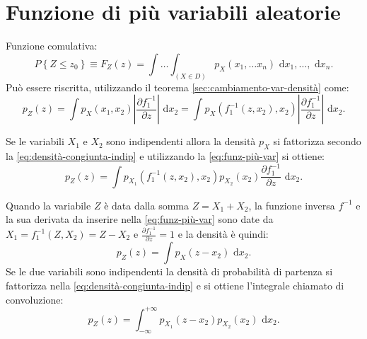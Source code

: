 \section{Funzione di più variabili aleatorie} %
\label{sec:funz-più-var}
Funzione comulativa:
\begin{equation}
P\left\{ Z\le z_{ 0 } \right\} \equiv F_{ Z }\left( z \right) =\int  \dots \int _{ ({X} \in D) }{ p_{ {X} }\left( x_{ 1 },\dots x_{ n } \right) \textrm{ d}x_{ 1 },\dots ,\textrm{ d}x_{ n } } .
\end{equation}
Può essere riscritta, utilizzando il teorema \ref{sec:cambiamento-var-densità} come:
\begin{equation}
\label{eq:funz-più-var}
p_{ Z }\left( z \right) =\int { { p }_{ X }\left( { x }_{ 1 },{ x }_{ 2 } \right) \left| \frac { \partial { f }_{ 1 }^{ -1 } }{ \partial z }  \right| \textrm{ d}{ x }_{ 2 } } =\int { { p }_{ X }\left( { f }_{ 1 }^{ -1 }\left( { z },{ x }_{ 2 } \right) ,{ x }_{ 2 } \right) \left| \frac { \partial { f }_{ 1 }^{ -1 } }{ \partial z }  \right| \textrm{ d}{ x }_{ 2 } } .
\end{equation}

Se le variabili $X_1$ e $X_2$ sono indipendenti allora la densità $p_X$ si fattorizza secondo la \ref{eq:densità-congiunta-indip} e utilizzando la \ref{eq:funz-più-var} si ottiene:
\begin{equation}
p_{ Z }\left( z \right) =\int { { p }_{ { X }_{ 1 } }\left( { f }_{ 1 }^{ -1 }\left( { z },{ x }_{ 2 } \right) ,{ x }_{ 2 } \right) { p }_{ { X }_{ 2 } }\left( { x }_{ 2 } \right) \frac { \partial { f }_{ 1 }^{ -1 } }{ \partial z } \textrm{ d}{ x }_{ 2 } } .
\end{equation}

Quando la variabile $Z$ è data dalla somma $Z=X_1+X_2$, la funzione inversa $f^{-1}$ e la sua derivata da inserire nella \ref{eq:funz-più-var} sono date da ${ X }_{ 1 }={ f }_{ 1 }^{ -1 }\left( Z,{ X }_{ 2 } \right) =Z-{ X }_{ 2 }$ e $\frac { \partial { f }_{ 1 }^{ -1 } }{ \partial z } =1$ e la densità è quindi:
\begin{equation}
p_{ Z }\left( z \right) =\int { { p }_{ { X } }\left( z-{ x }_{ 2 } \right) \textrm{ d}{ x }_{ 2 } }.
\end{equation}
Se le due variabili sono indipendenti la densità di probabilità di partenza si fattorizza nella \ref{eq:densità-congiunta-indip} e si ottiene l'integrale chiamato di convoluzione:
\begin{equation}
p_{ Z }\left( z \right) =\int _{ -\infty  }^{ +\infty  }{ { p }_{ { X }_{ 1 } }\left( z-{ x }_{ 2 } \right) { p }_{ { X }_{ 2 } }\left( { x }_{ 2 } \right) \textrm{ d}{ x }_{ 2 } } .
\end{equation}

